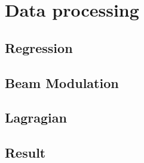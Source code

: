 \chapter{Data processing}

\section{Regression}

\section{Beam Modulation}

\section{Lagragian}

\section{Result}
